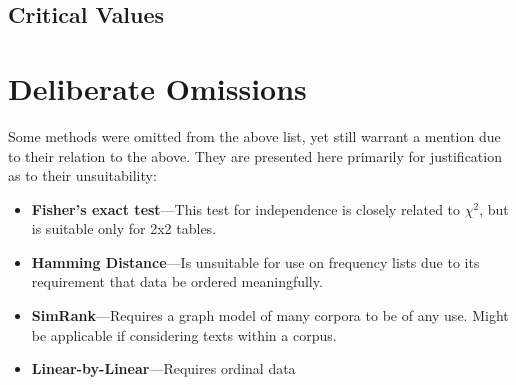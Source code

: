 \documentclass[11pt]{article}
\begin{document}
\subsection{Critical Values}



\section{Deliberate Omissions}
Some methods were omitted from the above list, yet still warrant a mention due to their relation to the above.  They are presented here primarily for justification as to their unsuitability:
\begin{itemize}
    \item \textbf{Fisher's exact test}---This test for independence is closely related to $\chi^2$, but is suitable only for 2x2 tables.
    \item \textbf{Hamming Distance}---Is unsuitable for use on frequency lists due to its requirement that data be ordered meaningfully.
    \item \textbf{SimRank}---Requires a graph model of many corpora to be of any use.  Might be applicable if considering texts within a corpus.
    \item \textbf{Linear-by-Linear}---Requires ordinal data
\end{itemize}









\end{document}
